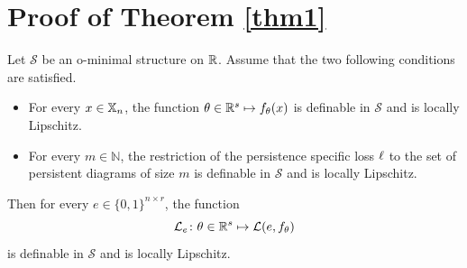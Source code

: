 
\section{Proof of Theorem \ref{thm1}}\label{apdx:proof}

\begin{lemma}\label{lem1}
Let $\mathcal{S}$ be an o-minimal structure on $\mathbb{R}$. Assume that the two following conditions are satisfied. 
    \begin{itemize}
        \item For every $x\in\mathbb{X}_n$, the function $\theta \in \mathbb{R}^s \mapsto f_\theta(x)$ is definable in $\mathcal{S}$ and is locally Lipschitz.
        \item For every $m\in\mathbb{N}$, the restriction of the persistence specific loss $\ell$ to the set of persistent diagrams of size $m$ 
is definable in $\mathcal{S}$ and is locally Lipschitz. 
    \end{itemize}
Then for every $e\in{\{0,1\}}^{n\times r}$, the function 
$$\mathcal{L}_e\colon\theta \in \mathbb{R}^s \mapsto \mathcal{L}(e,f_\theta)$$
is definable in $\mathcal{S}$ and is locally Lipschitz.
\end{lemma}

